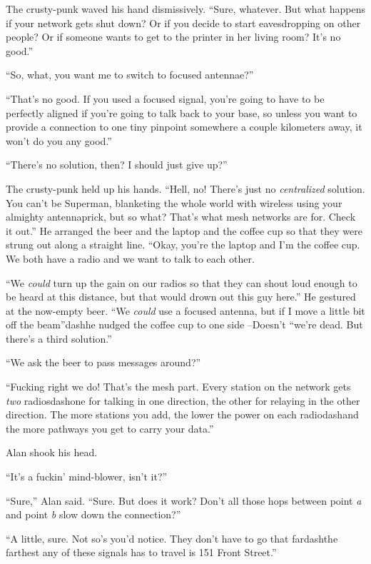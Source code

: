 The crusty-punk waved his hand dismissively.  ``Sure, whatever.  But
what happens if your network gets shut down?  Or if you decide to
start eavesdropping on other people?  Or if someone wants to get to
the printer in her living room?  It's no good.''

``So, what, you want me to switch to focused antennae?''

``That's no good.  If you used a focused signal, you're going to have
to be perfectly aligned if you're going to talk back to your base, so
unless you want to provide a connection to one tiny pinpoint somewhere
a couple kilometers away, it won't do you any good.''

``There's no solution, then?  I should just give up?''

The crusty-punk held up his hands.  ``Hell, no!  There's just no
\textit{centralized} solution.  You can't be Superman, blanketing the
whole world with wireless using your almighty antennaprick, but so
what?  That's what mesh networks are for.  Check it out.'' He arranged
the beer and the laptop and the coffee cup so that they were strung
out along a straight line.  ``Okay, you're the laptop and I'm the
coffee cup.  We both have a radio and we want to talk to each other.

``We \textit{could} turn up the gain on our radios so that they can
shout loud enough to be heard at this distance, but that would drown
out this guy here.'' He gestured at the now-empty beer.  ``We
\textit{could} use a focused antenna, but if I move a little bit off
the beam''dash{}he nudged the coffee cup to one side --Doesn't ``we're
dead.  But there's a third solution.''

``We ask the beer to pass messages around?''

``Fucking right we do!  That's the mesh part.  Every station on the
network gets \textit{two} radiosdash{}one for talking in one direction,
the other for relaying in the other direction.  The more stations you
add, the lower the power on each radiodash{}and the more pathways you get
to carry your data.''

Alan shook his head.

``It's a fuckin' mind-blower, isn't it?''

``Sure,'' Alan said.  ``Sure.  But does it work?  Don't all those hops
between point \textit{a} and point \textit{b} slow down the
connection?''

``A little, sure.  Not so's you'd notice.  They don't have to go that
fardash{}the farthest any of these signals has to travel is 151 Front
Street.''

